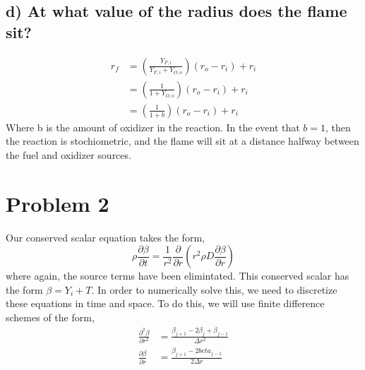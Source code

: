 \documentclass{article}
\begin{document}
\subsection*{d) At what value of the radius does the flame sit?}

\begin{eqnarray*}
 r_f &= \left(\frac{Y_{F,i}}{Y_{F,i} + Y_{O,o}} \right)(r_o - r_i) + r_i \\
     &= \left(\frac{1}{1 + Y_{O,o}} \right)(r_o - r_i) + r_i \\
     &= \left(\frac{1}{1 + b} \right)(r_o - r_i) + r_i 
\end{eqnarray*}
Where b is the amount of oxidizer in the reaction. In the event that
$b=1$, then the reaction is stochiometric, and the flame will sit at a
distance halfway between the fuel and oxidizer sources. 

\newpage
\section*{Problem 2}

Our conserved scalar equation takes the form,
\begin{equation*}
 \rho \frac{\partial \beta}{\partial t} = \frac{1}{r^2}\frac{\partial
  }{\partial r}\left( r^2 \rho D \frac{\partial \beta}{\partial r}
	       \right) 
\end{equation*}
where again, the source terms have been elimintated. This conserved
scalar has the form $\beta = Y_i + T$. In order to numerically solve
this, we need to discretize these equations in time and space. To do
this, we will use finite difference schemes of the form,
\begin{eqnarray*}
 \frac{\partial^2 \beta}{\partial r^2} &= \frac{\beta_{j+1}-2 \beta_j +
  \beta_{j-1}}{\Delta r^2}\\
 \frac{\partial \beta}{\partial r} &= \frac{\beta_{j+1}-2
 beta_{j-1}}{2\Delta r}
\end{eqnarray*}
\end{document}
